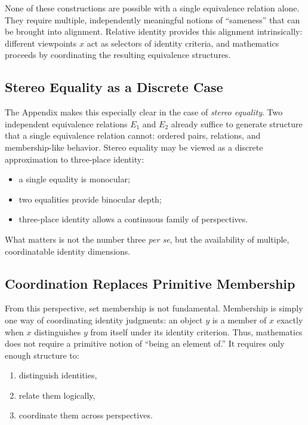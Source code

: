 \documentclass[11pt, a4paper]{article}
\theoremstyle{remark}
\begin{document}
None of these constructions are possible with a single equivalence relation alone. They require multiple, independently meaningful notions of ``sameness'' that can be brought into alignment. Relative identity provides this alignment intrinsically: different viewpoints $x$ act as selectors of identity criteria, and mathematics proceeds by coordinating the resulting equivalence structures.

\subsection{Stereo Equality as a Discrete Case}

The Appendix makes this especially clear in the case of \emph{stereo equality}. Two independent equivalence relations $E_1$ and $E_2$ already suffice to generate structure that a single equivalence relation cannot: ordered pairs, relations, and membership-like behavior. Stereo equality may be viewed as a discrete approximation to three-place identity:
\begin{itemize}
    \item a single equality is monocular;
    \item two equalities provide binocular depth;
    \item three-place identity allows a continuous family of perspectives.
\end{itemize}

What matters is not the number three \emph{per se}, but the availability of multiple, coordinatable identity dimensions.

\subsection{Coordination Replaces Primitive Membership}

From this perspective, set membership is not fundamental. Membership is simply one way of coordinating identity judgments: an object $y$ is a member of $x$ exactly when $x$ distinguishes $y$ from itself under its identity criterion. Thus, mathematics does not require a primitive notion of ``being an element of.'' It requires only enough structure to:
\begin{enumerate}
    \item distinguish identities,
    \item relate them logically,
    \item coordinate them across perspectives.
\end{enumerate}
\end{document}
